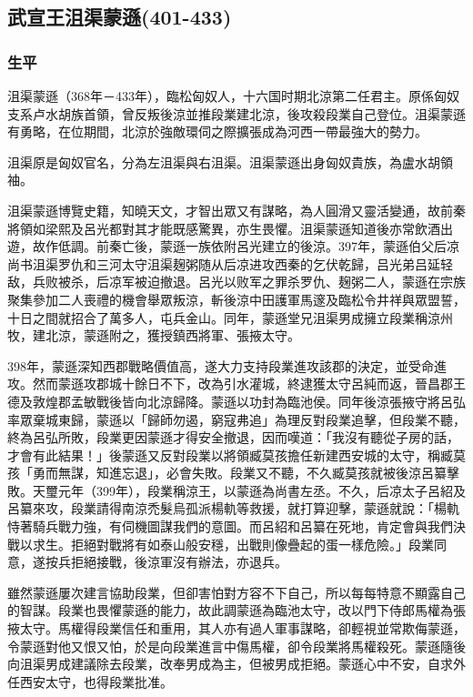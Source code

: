 
\subsection{武宣王沮渠蒙遜\tiny(401-433)}

\subsubsection{生平}

沮渠蒙遜（368年－433年），臨松匈奴人，十六国时期北涼第二任君主。原係匈奴支系卢水胡族首領，曾反叛後涼並推段業建北涼，後攻殺段業自己登位。沮渠蒙遜有勇略，在位期間，北涼於強敵環伺之際擴張成為河西一帶最強大的勢力。

沮渠原是匈奴官名，分為左沮渠與右沮渠。沮渠蒙遜出身匈奴貴族，為盧水胡領袖。

沮渠蒙遜博覽史籍，知曉天文，才智出眾又有謀略，為人圓滑又靈活變通，故前秦將領如梁熙及呂光都對其才能既感驚異，亦生畏懼。沮渠蒙遜知道後亦常飲酒出遊，故作低調。前秦亡後，蒙遜一族依附呂光建立的後涼。397年，蒙遜伯父后凉尚书沮渠罗仇和三河太守沮渠麹粥随从后凉进攻西秦的乞伏乾歸，吕光弟吕延轻敌，兵败被杀，后凉军被迫撤退。呂光以败军之罪杀罗仇、麹粥二人，蒙遜在宗族聚集參加二人喪禮的機會舉眾叛涼，斬後涼中田護軍馬邃及臨松令井祥與眾盟誓，十日之間就招合了萬多人，屯兵金山。同年，蒙遜堂兄沮渠男成擁立段業稱涼州牧，建北涼，蒙遜附之，獲授鎮西將軍、張掖太守。

398年，蒙遜深知西郡戰略價值高，遂大力支持段業進攻該郡的決定，並受命進攻。然而蒙遜攻郡城十餘日不下，改為引水灌城，終逮獲太守呂純而返，晉昌郡王德及敦煌郡孟敏戰後皆向北涼歸降。蒙遜以功封為臨池侯。同年後涼張掖守將呂弘率眾棄城東歸，蒙遜以「歸師勿遏，窮寇弗追」為理反對段業追擊，但段業不聽，終為呂弘所敗，段業更因蒙遜才得安全撤退，因而嘆道：「我沒有聽從子房的話，才會有此結果！」後蒙遜又反對段業以將領臧莫孩擔任新建西安城的太守，稱臧莫孩「勇而無謀，知進忘退」，必會失敗。段業又不聽，不久臧莫孩就被後涼呂纂擊敗。天璽元年（399年），段業稱涼王，以蒙遜為尚書左丞。不久，后凉太子呂紹及呂纂來攻，段業請得南涼禿髮烏孤派楊軌等救援，就打算迎擊，蒙遜就說：「楊軌恃著騎兵戰力強，有伺機圖謀我們的意圖。而呂紹和呂纂在死地，肯定會與我們決戰以求生。拒絕對戰將有如泰山般安穩，出戰則像疊起的蛋一樣危險。」段業同意，遂按兵拒絕接戰，後涼軍沒有辦法，亦退兵。

雖然蒙遜屢次建言協助段業，但卻害怕對方容不下自己，所以每每特意不顯露自己的智謀。段業也畏懼蒙遜的能力，故此調蒙遜為臨池太守，改以門下侍郎馬權為張掖太守。馬權得段業信任和重用，其人亦有過人軍事謀略，卻輕視並常欺侮蒙遜，令蒙遜對他又恨又怕，於是向段業進言中傷馬權，卻令段業將馬權殺死。蒙遜隨後向沮渠男成建議除去段業，改奉男成為主，但被男成拒絕。蒙遜心中不安，自求外任西安太守，也得段業批准。

